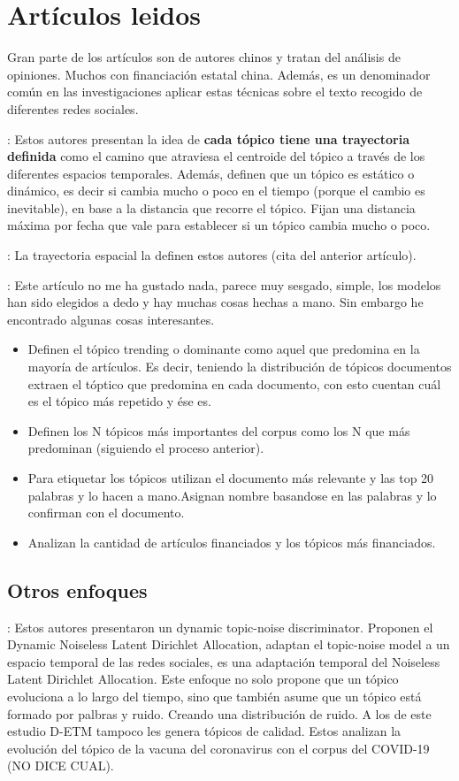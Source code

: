 \documentclass[a4paper,10pt]{article}
\begin{document}
\section{Artículos leidos}

Gran parte de los artículos son de autores chinos y tratan del análisis de opiniones. Muchos con financiación estatal china. Además, es un denominador común en las investigaciones aplicar estas técnicas sobre el texto recogido de diferentes redes sociales.

\cite{Yao2020}: Estos autores presentan la idea de \textbf{cada tópico tiene una trayectoria definida} como el camino que atraviesa el centroide del tópico a través de los diferentes espacios temporales. Además, definen que un tópico es estático o dinámico, es decir si cambia mucho o poco en el tiempo (porque el cambio es inevitable), en base a la distancia que recorre el tópico. Fijan una distancia máxima por fecha que vale para establecer si un tópico cambia mucho o poco.

\cite{Lee2011}: La trayectoria espacial la definen estos autores (cita del anterior artículo).

\cite{Alazba2022}: Este artículo no me ha gustado nada, parece muy sesgado, simple, los modelos han sido elegidos a dedo y hay muchas cosas hechas a mano. Sin embargo he encontrado algunas cosas interesantes.
\begin{itemize}
 \item Definen el tópico trending o dominante como aquel que predomina en la mayoría de artículos. Es decir, teniendo la distribución de tópicos documentos extraen el tóptico que predomina en cada documento, con esto cuentan cuál es el tópico más repetido y ése es.
 \item Definen los N tópicos más importantes del corpus como los N que más predominan (siguiendo el proceso anterior).
 \item Para etiquetar los tópicos utilizan el documento más relevante y las top 20 palabras y lo hacen a mano.Asignan nombre basandose en las palabras y lo confirman con el documento.
 \item Analizan la cantidad de artículos financiados y los tópicos más financiados.
\end{itemize}



\subsection{Otros enfoques}
\cite{Churchill2022}: Estos autores presentaron un dynamic topic-noise discriminator. Proponen el Dynamic Noiseless Latent Dirichlet Allocation, adaptan el topic-noise model a un espacio temporal de las redes sociales, es una adaptación temporal del Noiseless Latent Dirichlet Allocation. Este enfoque no solo propone que un tópico evoluciona a lo largo del tiempo, sino que también asume que un tópico está formado por palbras y ruido. Creando una distribución de ruido. A los de este estudio D-ETM tampoco les genera tópicos de calidad. Estos analizan la evolución del tópico de la vacuna del coronavirus con el corpus del COVID-19 (NO DICE CUAL).
\end{document}
